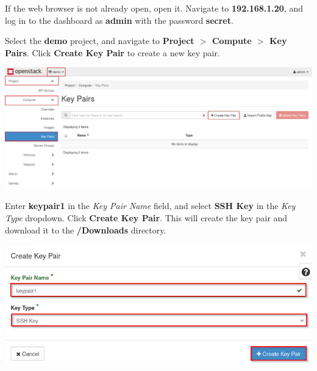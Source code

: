 \documentclass[letterpaper, 12pt]{article}
\begin{document}
\begin{enumerate}
    \begin{labstep}
        If the web browser is not already open, open it.
        Navigate to \textbf{192.168.1.20}, and log in to the dashboard as \textbf{admin} with the password \textbf{secret}.
    \end{labstep}

    \begin{labstep}
        Select the \textbf{demo} project, and navigate to \textbf{Project $>$ Compute $>$ Key Pairs}.
        Click \textbf{Create Key Pair} to create a new key pair.

        \begin{center}
            \includegraphics[width=\linewidth]{images/part7/step2.png}
        \end{center}
    \end{labstep}

    \begin{labstep}
        Enter \textbf{keypair1} in the \textit{Key Pair Name} field, and select \textbf{SSH Key} in the \textit{Key Type} dropdown.
        Click \textbf{Create Key Pair}.
        This will create the key pair and download it to the \textbf{\texttildemid/Downloads} directory.

        \begin{center}
            \includegraphics[width=\linewidth]{images/part7/step3.png}
        \end{center}
    \end{labstep}


\end{enumerate}
\end{document}
